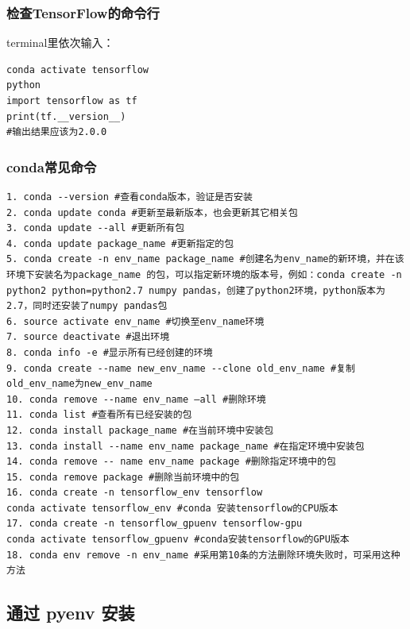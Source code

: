 \documentclass[12pt]{article}
\begin{document}
\subsubsection{检查TensorFlow的命令行}
terminal里依次输入：
\begin{lstlisting}
conda activate tensorflow
python
import tensorflow as tf
print(tf.__version__)
#输出结果应该为2.0.0
\end{lstlisting}

\subsubsection{conda常见命令}
\begin{lstlisting}
1. conda --version #查看conda版本，验证是否安装
2. conda update conda #更新至最新版本，也会更新其它相关包
3. conda update --all #更新所有包
4. conda update package_name #更新指定的包
5. conda create -n env_name package_name #创建名为env_name的新环境，并在该环境下安装名为package_name 的包，可以指定新环境的版本号，例如：conda create -n python2 python=python2.7 numpy pandas，创建了python2环境，python版本为2.7，同时还安装了numpy pandas包
6. source activate env_name #切换至env_name环境
7. source deactivate #退出环境
8. conda info -e #显示所有已经创建的环境
9. conda create --name new_env_name --clone old_env_name #复制old_env_name为new_env_name
10. conda remove --name env_name –all #删除环境
11. conda list #查看所有已经安装的包
12. conda install package_name #在当前环境中安装包
13. conda install --name env_name package_name #在指定环境中安装包
14. conda remove -- name env_name package #删除指定环境中的包
15. conda remove package #删除当前环境中的包
16. conda create -n tensorflow_env tensorflow
conda activate tensorflow_env #conda 安装tensorflow的CPU版本
17. conda create -n tensorflow_gpuenv tensorflow-gpu
conda activate tensorflow_gpuenv #conda安装tensorflow的GPU版本
18. conda env remove -n env_name #采用第10条的方法删除环境失败时，可采用这种方法
\end{lstlisting}


\subsection{通过 pyenv 安装}
\end{document}
